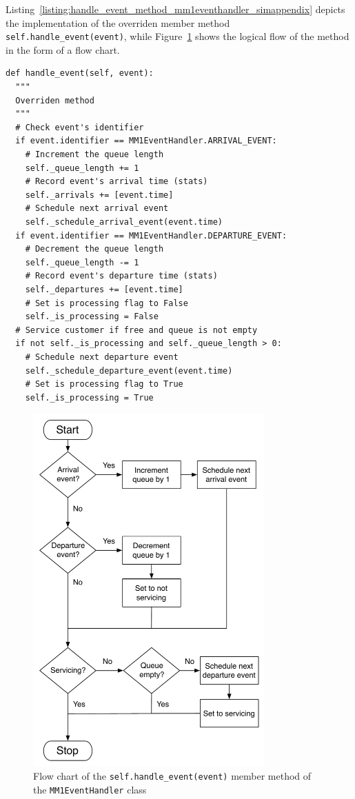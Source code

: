 Listing~\ref{listing:handle_event_method_mm1eventhandler_simappendix} depicts the implementation of the overriden member method \lstinline{self.handle_event(event)}, while Figure~\ref{fig:mm1_handle_event_simappendix} shows the logical flow of the method in the form of a flow chart.

\begin{lstlisting}[caption=\lstinline{self.handle_event(event)} member method of the \lstinline{MM1EventHandler} class, label=listing:handle_event_method_mm1eventhandler_simappendix]
def handle_event(self, event):
  """
  Overriden method
  """
  # Check event's identifier
  if event.identifier == MM1EventHandler.ARRIVAL_EVENT:
    # Increment the queue length
    self._queue_length += 1
    # Record event's arrival time (stats)
    self._arrivals += [event.time]
    # Schedule next arrival event
    self._schedule_arrival_event(event.time)
  if event.identifier == MM1EventHandler.DEPARTURE_EVENT:
    # Decrement the queue length
    self._queue_length -= 1
    # Record event's departure time (stats)
    self._departures += [event.time]
    # Set is processing flag to False
    self._is_processing = False
  # Service customer if free and queue is not empty
  if not self._is_processing and self._queue_length > 0:
    # Schedule next departure event
    self._schedule_departure_event(event.time)
    # Set is processing flag to True
    self._is_processing = True
\end{lstlisting}

\begin{figure}[p]
  \includegraphics[width=3.5in]{Appendices/Figures/mm1_handle_event}
  \caption{Flow chart of the \lstinline{self.handle_event(event)} member method of the \lstinline{MM1EventHandler} class}
  \label{fig:mm1_handle_event_simappendix}
\end{figure}

